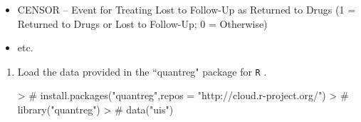 \documentclass{article}
\begin{document}
\begin{enumerate}
\begin{itemize}
    \item CENSOR -- Event for Treating Lost to Follow-Up as Returned to Drugs 
    (1 = Returned to Drugs or Lost to Follow-Up; 0 = Otherwise)
    \item etc.
  \end{itemize}
  \begin{enumerate} %
    \item Load the data provided in the ``quantreg" package for \texttt{R} \citep{quantreg}.
\begin{Schunk}
\begin{Sinput}
> # install.packages("quantreg",repos = "http://cloud.r-project.org/")
> # library("quantreg")
> # data("uis")
\end{Sinput}
\end{Schunk}


\end{enumerate}
\end{enumerate}
\end{document}
